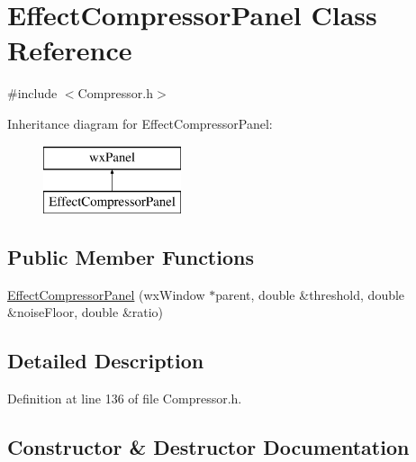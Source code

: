\hypertarget{class_effect_compressor_panel}{}\section{Effect\+Compressor\+Panel Class Reference}
\label{class_effect_compressor_panel}


{\ttfamily \#include $<$Compressor.\+h$>$}

Inheritance diagram for Effect\+Compressor\+Panel\+:\begin{figure}[H]
\begin{center}
\leavevmode
\includegraphics[height=2.000000cm]{class_effect_compressor_panel}
\end{center}
\end{figure}
\subsection*{Public Member Functions}
\begin{DoxyCompactItemize}
\item 
\hyperlink{class_effect_compressor_panel_a872a100dff20920fd28cdfa4255eb92b}{Effect\+Compressor\+Panel} (wx\+Window $\ast$parent, double \&threshold, double \&noise\+Floor, double \&ratio)
\end{DoxyCompactItemize}


\subsection{Detailed Description}


Definition at line 136 of file Compressor.\+h.



\subsection{Constructor \& Destructor Documentation}
